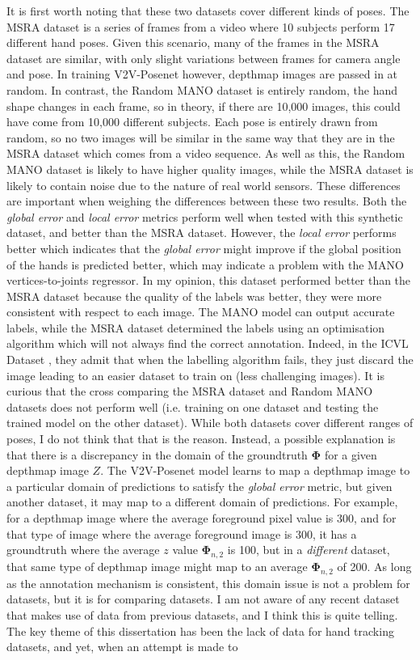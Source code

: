 It is first worth noting that these two datasets cover different kinds of poses. The MSRA dataset is a series of frames from a video where 10 subjects perform 17 different hand poses. Given this scenario, many of the frames in the MSRA dataset are similar, with only slight variations between frames for camera angle and pose. In training V2V-Posenet however, depthmap images are passed in at random. In contrast, the Random MANO dataset is entirely random, the hand shape changes in each frame, so in theory, if there are 10,000 images, this could have come from 10,000 different subjects. Each pose is entirely drawn from random, so no two images will be similar in the same way that they are in the MSRA dataset which comes from a video sequence. As well as this, the Random MANO dataset is likely to have higher quality images, while the MSRA dataset is likely to contain noise due to the nature of real world sensors. These differences are important when weighing the differences between these two results. Both the {\slshape global error} and {\slshape local error} metrics perform well when tested with this synthetic dataset, and better than the MSRA dataset. However, the {\slshape local error} performs better which indicates that the {\slshape global error} might improve if the global position of the hands is predicted better, which may indicate a problem with the MANO vertices-to-joints regressor. In my opinion, this dataset performed better than the MSRA dataset because the quality of the labels was better, they were more consistent with respect to each image. The MANO model can output accurate labels, while the MSRA dataset determined the labels using an optimisation algorithm \cite{sun2015cascaded} which will not always find the correct annotation. Indeed, in the ICVL Dataset \cite{tang2016latent}, they admit that when the labelling algorithm fails, they just discard the image leading to an easier dataset to train on (less challenging images). It is curious that the cross comparing the MSRA dataset and Random MANO datasets does not perform well (i.e. training on one dataset and testing the trained model on the other dataset). While both datasets cover different ranges of poses, I do not think that that is the reason. Instead, a possible explanation is that there is a discrepancy in the domain of the groundtruth $\bm{\Phi}$ for a given depthmap image $Z$. The V2V-Posenet model learns to map a depthmap image to a particular domain of predictions to satisfy the {\slshape global error} metric, but given another dataset, it may map to a different domain of predictions. For example, for a depthmap image where the average foreground pixel value is 300, and for that type of image where the average foreground image is 300, it has a groundtruth where the average $z$ value $\bm{\Phi}_{n,2}$ is 100, but in a {\slshape different} dataset, that same type of depthmap image might map to an average $\bm{\Phi}_{n,2}$ of 200. As long as the annotation mechanism is consistent, this domain issue is not a problem for datasets, but it is for comparing datasets. I am not aware of any recent dataset that makes use of data from previous datasets, and I think this is quite telling. The key theme of this dissertation has been the lack of data for hand tracking datasets, and yet, when an attempt is made to 